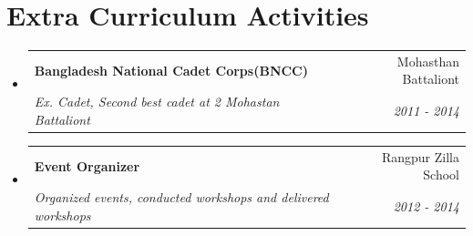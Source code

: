 \documentclass[a4paper]{article}
\makeatletter
\newcommand{\resumeSubheading}[4]{
  \vspace{-1pt}\item
    \begin{tabular*}{0.97\textwidth}{l@{\extracolsep{\fill}}r}
      \textbf{#1} & #2 \\
      \textit{#3} & \textit{#4} \\
    \end{tabular*}\vspace{-5pt}
}
\newcommand{\resumeSubHeadingListStart}{\begin{itemize}[leftmargin=*]}
\newcommand{\resumeSubHeadingListEnd}{\end{itemize}}
\makeatother
\begin{document}

\section{Extra Curriculum Activities}
  \resumeSubHeadingListStart
	\resumeSubheading
    {Bangladesh National Cadet Corps(BNCC)}{Mohasthan Battaliont}
    {Ex. Cadet, Second best cadet at 2 Mohastan Battaliont}{2011 - 2014}
    \vspace{.5pt}
    \resumeSubheading
    {Event Organizer}{Rangpur Zilla School}
    {Organized events, conducted workshops and delivered workshops}{2012 - 2014}
\resumeSubHeadingListEnd
\vspace{1pt}





\end{document}
